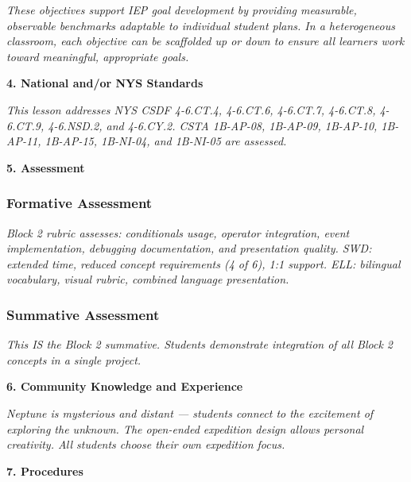 \documentclass[11pt,letterpaper]{article}
\begin{document}
\textit{These objectives support IEP goal development by providing measurable, observable benchmarks adaptable to individual student plans. In a heterogeneous classroom, each objective can be scaffolded up or down to ensure all learners work toward meaningful, appropriate goals.}

\textbf{4. National and/or NYS Standards}

\textit{This lesson addresses NYS CSDF 4-6.CT.4, 4-6.CT.6, 4-6.CT.7, 4-6.CT.8, 4-6.CT.9, 4-6.NSD.2, and 4-6.CY.2. CSTA 1B-AP-08, 1B-AP-09, 1B-AP-10, 1B-AP-11, 1B-AP-15, 1B-NI-04, and 1B-NI-05 are assessed.}

\newpage
\textbf{5. Assessment}

\subsubsection{Formative Assessment}

\textit{Block 2 rubric assesses: conditionals usage, operator integration, event implementation, debugging documentation, and presentation quality. SWD: extended time, reduced concept requirements (4 of 6), 1:1 support. ELL: bilingual vocabulary, visual rubric, combined language presentation.}

\subsubsection{Summative Assessment}

\textit{This IS the Block 2 summative. Students demonstrate integration of all Block 2 concepts in a single project.}

\textbf{6. Community Knowledge and Experience}

\textit{Neptune is mysterious and distant --- students connect to the excitement of exploring the unknown. The open-ended expedition design allows personal creativity. All students choose their own expedition focus.}

\textbf{7. Procedures}
\end{document}

